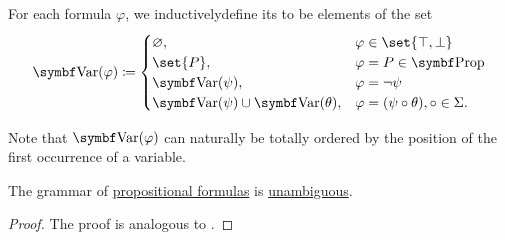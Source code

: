 \begin{definition}
\begin{defenum}
     For each formula \( \varphi \), we inductively\IND define its  to be elements of the set
    \begin{equation}\label{eq:def:propositional_syntax/varables}
      \bfop{Var}(\varphi) \coloneqq \begin{cases}
        \varnothing,                              &\varphi \in \set{ \top, \bot }                     \\
        \set{ P },                                  &\varphi = P \in \bfop{Prop}                      \\
        \bfop{Var}(\psi),                         &\varphi = \neg \psi                              \\
        \bfop{Var}(\psi) \cup \bfop{Var}(\theta), &\varphi = (\psi \circ \theta), \circ \in \Sigma.
      \end{cases}
    \end{equation}

    Note that \( \bfop{Var}(\varphi) \) can naturally be totally ordered by the position of the first occurrence of a variable.
  \end{defenum}
\end{definition}

\begin{proposition}\label{thm:propositional_formulas_are_unambiguous}
  The grammar of \hyperref[def:propositional_syntax/formula]{propositional formulas} is \hyperref[def:grammar_derivation/ambiguity]{unambiguous}.
\end{proposition}
\begin{proof}
  The proof is analogous to .
\end{proof}

